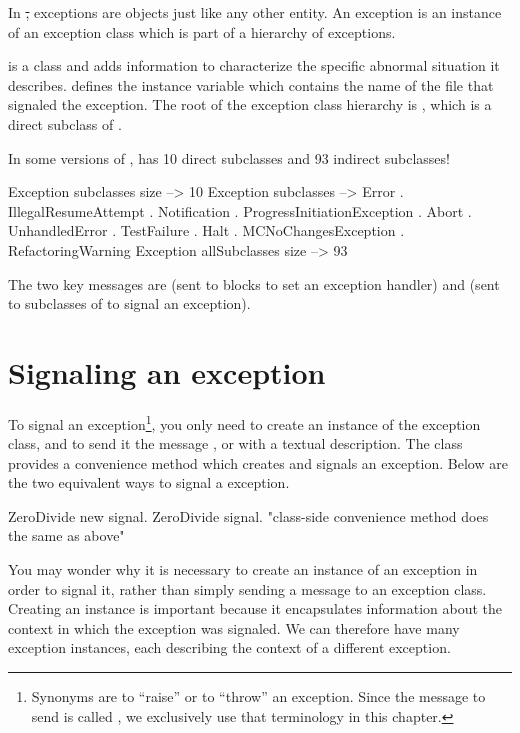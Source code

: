 \documentclass[a4paper,10pt,twoside]{book}
\begin{document}
In \st, exceptions are objects just like any other entity. An exception is an instance of an exception class which is part of a hierarchy of exceptions.

 is a class and adds information to characterize the specific abnormal situation it describes.  defines the  instance variable which contains the name of the file that signaled the exception. The root of the exception class hierarchy is , which is a direct subclass of .

In some versions of \pharo,  has 10 direct subclasses and 93 indirect subclasses!
\begin{code}{} %
Exception subclasses size     --> 10
Exception subclasses 	        --> {Error . IllegalResumeAttempt . Notification . ProgressInitiationException . Abort . UnhandledError . TestFailure . Halt . MCNoChangesException . RefactoringWarning}
Exception allSubclasses size --> 93
\end{code}

The two key messages are  (sent to blocks to set an exception handler) and  (sent to subclasses of  to signal an exception).

\section{Signaling an exception}

To signal an exception\footnote{Synonyms are to ``raise'' or to ``throw'' an exception. Since the message to send is called , we exclusively use that terminology in this chapter.}, you only need to create an instance of the exception class, and to send it the message , or  with a textual description. The class  provides a convenience method  which creates and signals an exception. Below are the two equivalent ways to signal a  exception.
\begin{code}{}
	ZeroDivide new signal.
	ZeroDivide signal.    "class-side convenience method does the same as above"
\end{code}

You may wonder why it is necessary to create an instance of an exception in order to signal it, rather than simply sending a message to an exception class. Creating an instance is important because it encapsulates information about the context in which the exception was signaled. We can therefore have many exception instances, each describing the context of a different exception.
\end{document}
